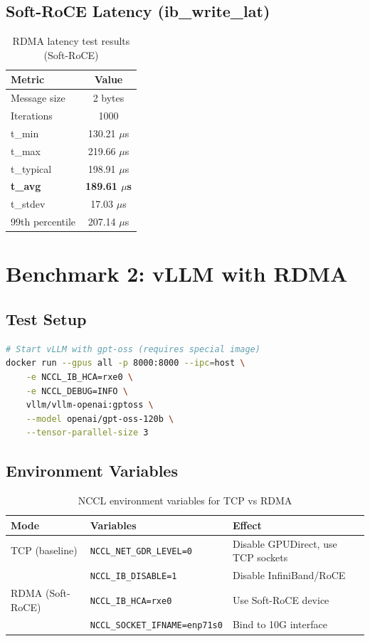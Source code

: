 \documentclass[10pt,letterpaper]{article}
\begin{document}
\subsection{Soft-RoCE Latency (ib\_write\_lat)}

\begin{table}[H]
\centering
\small
\begin{tabular}{@{}lc@{}}
\toprule
\textbf{Metric} & \textbf{Value} \\
\midrule
Message size & 2 bytes \\
Iterations & 1000 \\
t\_min & 130.21 $\mu$s \\
t\_max & 219.66 $\mu$s \\
t\_typical & 198.91 $\mu$s \\
\textbf{t\_avg} & \textbf{189.61 $\mu$s} \\
t\_stdev & 17.03 $\mu$s \\
99th percentile & 207.14 $\mu$s \\
\bottomrule
\end{tabular}
\caption{RDMA latency test results (Soft-RoCE)}
\end{table}

\section{Benchmark 2: vLLM with RDMA}

\subsection{Test Setup}

\begin{lstlisting}[language=bash]
# Start vLLM with gpt-oss (requires special image)
docker run --gpus all -p 8000:8000 --ipc=host \
    -e NCCL_IB_HCA=rxe0 \
    -e NCCL_DEBUG=INFO \
    vllm/vllm-openai:gptoss \
    --model openai/gpt-oss-120b \
    --tensor-parallel-size 3
\end{lstlisting}

\subsection{Environment Variables}

\begin{table}[H]
\centering
\small
\begin{tabular}{@{}llp{6cm}@{}}
\toprule
\textbf{Mode} & \textbf{Variables} & \textbf{Effect} \\
\midrule
TCP (baseline) & \texttt{NCCL\_NET\_GDR\_LEVEL=0} & Disable GPUDirect, use TCP sockets \\
 & \texttt{NCCL\_IB\_DISABLE=1} & Disable InfiniBand/RoCE \\
\midrule
RDMA (Soft-RoCE) & \texttt{NCCL\_IB\_HCA=rxe0} & Use Soft-RoCE device \\
 & \texttt{NCCL\_SOCKET\_IFNAME=enp71s0} & Bind to 10G interface \\
\bottomrule
\end{tabular}
\caption{NCCL environment variables for TCP vs RDMA}
\end{table}
\end{document}
